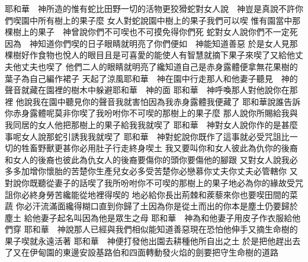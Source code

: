 \bchapter%
耶和華　神所造的\chientien 惟有蛇比田野一切的活物更狡猾\chuan 蛇對女人說\chientien 　神豈是真說\chientien 不許你們喫園中所有樹上的果子麼\chuan 
{}女人對蛇說\chientien 園中樹上的果子我們可以喫\yuentien 
{}惟有園當中那棵樹上的果子\chientien 　神曾說\chientien 你們不可喫\chientien 也不可摸\chientien 免得你們死\chuan 
{}蛇對女人說\chientien 你們不一定死\chientien 
{}因為　神知道\chientien 你們喫的日子眼睛就明亮了\chientien 你們便如　神能知道善惡\chuan 
{}於是女人見那棵樹好作食物\chientien 也悅人的眼目\chientien 且是可喜愛的\chientien 能使人有智慧\chientien 就摘下果子來喫了\yuentien 又給他丈夫\chientien 他丈夫也喫了\chuan 
{}他們二人的眼睛就明亮了\chientien 纔知道自己是赤身露體\chientien 便拿無花果樹的葉子\chientien 為自己編作裙子\chuan 
{}天起了涼風\chientien 耶和華　神在園中行走\chuan 那人和他妻子聽見　神的聲音\chientien 就藏在園裡的樹木中\chientien 躲避耶和華　神的面\chuan 
{}耶和華　神呼喚那人\chientien 對他說\chientien 你在那裡\chuan 
{}他說\chientien 我在園中聽見你的聲音\chientien 我就害怕\chientien 因為我赤身露體\yuentien 我便藏了\chuan 
{}耶和華說\chientien 誰告訴你赤身露體呢\chientien 莫非你喫了我吩咐你不可喫的那樹上的果子麼\chuan 
{}那人說\chientien 你所賜給我\chientien 與我同居的女人\chientien 他把那樹上的果子給我\chientien 我就喫了\chuan 
{}耶和華　神對女人說\chientien 你作的是甚麼事呢\chuan 女人說\chientien 那蛇引誘我\chientien 我就喫了\chuan 
{}耶和華　神對蛇說\chientien 你既作了這事\chientien 就必受咒詛\chientien 比一切的牲畜野獸更甚\chientien 你必用肚子行走\chientien 終身喫土\chuan 
{}我又要叫你和女人彼此為仇\chientien 你的後裔和女人的後裔\chientien 也彼此為仇\yuentien 女人的後裔要傷你的頭\chientien 你要傷他的腳跟\chuan 
{}又對女人說\chientien 我必多多加增你懷胎的苦楚\chientien 你生產兒女必多受苦楚\yuentien 你必戀慕你丈夫\chientien 你丈夫必管轄你\chuan 
{}又對說\chientien 你既聽從妻子的話\chientien 喫了我所吩咐你不可喫的那樹上的果子\chientien 地必為你的緣故受咒詛\yuentien 你必終身勞苦\chientien 纔能從地裡得喫的\chuan 
{}地必給你長出荊棘和蒺藜來\chientien 你也要喫田間的菜蔬\chuan 
{}你必汗流滿面纔得糊口\chientien 直到你歸了土\chientien 因為你是從土而出的\yuentien 你本是塵土\chientien 仍要歸於塵土\chuan 
{}給他妻子起名叫\chientien 因為他是眾生之母\chuan 
{}耶和華　神為和他妻子用皮子作衣服\chientien 給他們穿\chuan\Chuan
{}耶和華　神說\chientien 那人已經與我們相似\chientien 能知道善惡\yuentien 現在恐怕他伸手又摘生命樹的果子喫\chientien 就永遠活著\yuentien 
{}耶和華　神便打發他出園去\chientien 耕種他所自出之土\chuan 
{}於是把他趕出去了\yuentien 又在伊甸園的東邊安設基路伯\chientien 和四面轉動發火焰的劍\chientien 要把守生命樹的道路\chuan 

